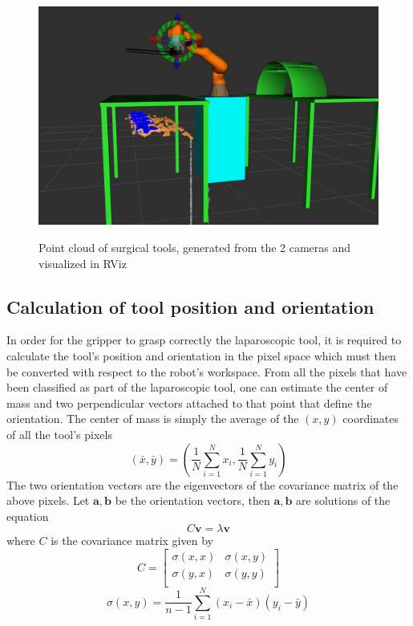 \begin{center}
\begin{figure}[H]
\centering
\includegraphics[width=12cm]{images/point_cloud.png}\\
\caption{Point cloud of surgical tools, generated from the 2 cameras and visualized in RViz}
\end{figure}
\end{center}

\subsection{Calculation of tool position and orientation}

In order for the gripper to grasp correctly the laparoscopic tool, it is required to calculate the tool's position and orientation in the pixel space 
which must then be converted with respect to the robot's workspace. From all the pixels that have been classified as part of the laparoscopic tool, 
one can estimate the center of mass and two perpendicular vectors 
attached to that point that define the orientation. The center of mass is simply the average of the $(x,y)$ coordinates of all the tool's pixels
\[
\left( \bar{x}, \bar{y} \right) = \left( \frac{1}{N}\sum_{i=1}^{N} x_i , \frac{1}{N}\sum_{i=1}^{N} y_i \right)
\]
The two orientation vectors are the eigenvectors of the covariance matrix of the above pixels. Let $\mathbf{a},\mathbf{b}$ be the orientation vectors, 
then $\mathbf{a},\mathbf{b}$ are solutions of the equation
\[
C \mathbf{v} = λ \mathbf{v}
\]
where $C$ is the covariance matrix given by
\[
C = \begin{bmatrix}
σ(x,x) & σ(x,y) \\
σ(y,x) & σ(y,y) \\
\end{bmatrix}
\]
\[
σ(x,y) = \frac{1}{n-1} \sum_{i=1}^{N} ( x_i - \bar{x} )( y_i - \bar{y} )
\]

